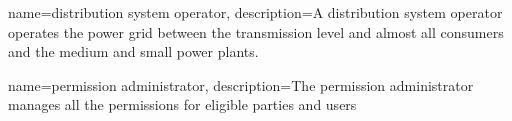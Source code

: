 {
    name={distribution system operator},
    description={A distribution system operator operates the power grid between the transmission level and almost all consumers and the medium and small power plants.}
}

{
    name={permission administrator},
    description={The permission administrator manages all the permissions for eligible parties and users}
}

\makeglossary